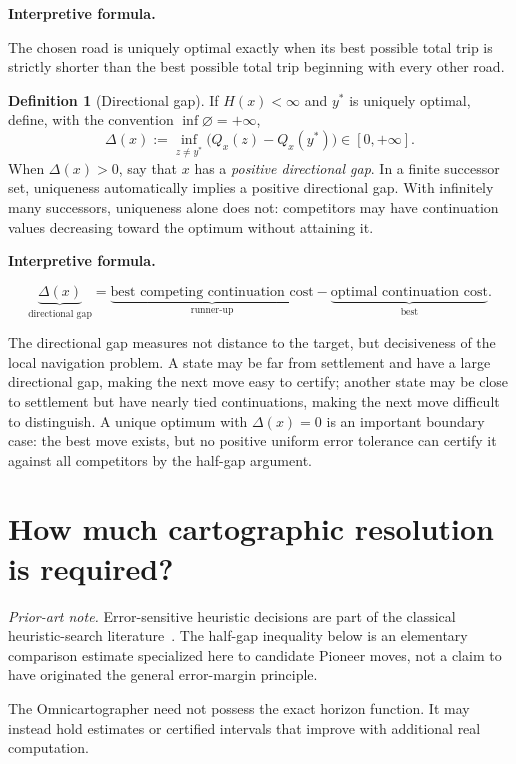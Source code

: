 \documentclass[11pt]{article}
\theoremstyle{definition}
\newtheorem{definition}[theorem]{Definition}
\theoremstyle{remark}
\newcommand{\Qval}{Q}
\newcommand{\Gap}{\Delta}
\newenvironment{interpretiveformula}{%
  \begin{center}\begin{minipage}{0.92\linewidth}\small
  \textbf{Interpretive formula.}\ \raggedright}{\end{minipage}\end{center}}
\begin{document}
\begin{interpretiveformula}
The chosen road is uniquely optimal exactly when its best possible total trip is strictly shorter than the best possible total trip beginning with every other road.
\end{interpretiveformula}

\begin{definition}[Directional gap]
If $H(x)<\infty$ and $y^*$ is uniquely optimal, define, with the convention $\inf\varnothing=+\infty$,
\[
\Gap(x):=\inf_{z\neq y^*}\bigl(\Qval_x(z)-\Qval_x(y^*)\bigr)\in[0,+\infty].
\]
When $\Gap(x)>0$, say that $x$ has a \emph{positive directional gap}. In a finite successor set, uniqueness automatically implies a positive directional gap. With infinitely many successors, uniqueness alone does not: competitors may have continuation values decreasing toward the optimum without attaining it.
\end{definition}

\begin{interpretiveformula}
\[
\underbrace{\Gap(x)}_{\text{directional gap}}
=
\underbrace{\text{best competing continuation cost}}_{\text{runner-up}}
-
\underbrace{\text{optimal continuation cost}}_{\text{best}}.
\]
\end{interpretiveformula}

The directional gap measures not distance to the target, but decisiveness of the local navigation problem. A state may be far from settlement and have a large directional gap, making the next move easy to certify; another state may be close to settlement but have nearly tied continuations, making the next move difficult to distinguish. A unique optimum with $\Gap(x)=0$ is an important boundary case: the best move exists, but no positive uniform error tolerance can certify it against all competitors by the half-gap argument.

\section{How much cartographic resolution is required?}
\noindent\textit{Prior-art note.} Error-sensitive heuristic decisions are part of the classical heuristic-search literature~\cite{astar,pearl}. The half-gap inequality below is an elementary comparison estimate specialized here to candidate Pioneer moves, not a claim to have originated the general error-margin principle.

The Omnicartographer need not possess the exact horizon function. It may instead hold estimates or certified intervals that improve with additional real computation.
\end{document}
